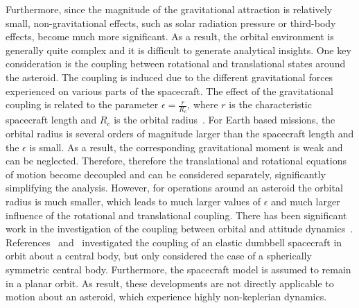 \documentclass[letterpaper, paper,11pt]{AAS}		%
\begin{document}
Furthermore, since the magnitude of the gravitational attraction is relatively small, non-gravitational effects, such as solar radiation pressure or third-body effects, become much more significant.
As a result, the orbital environment is generally quite complex and it is difficult to generate analytical insights.
One key consideration is the coupling between rotational and translational states around the asteroid.
The coupling is induced due to the different gravitational forces experienced on various parts of the spacecraft.
The effect of the gravitational coupling is related to the parameter \(\epsilon = \frac{r}{R_c}\), where \(r\) is the characteristic spacecraft length and \(R_c\) is the orbital radius~\cite{hughes2004}.
For Earth based missions, the orbital radius is several orders of magnitude larger than the spacecraft length and the \(\epsilon\) is small.
As a result, the corresponding gravitational moment is weak and can be neglected. 
Therefore, therefore the translational and rotational equations of motion become decoupled and can be considered separately, significantly simplifying the analysis. 
However, for operations around an asteroid the orbital radius is much smaller, which leads to much larger values of \(\epsilon\) and much larger influence of the rotational and translational coupling.
There has been significant work in the investigation of the coupling between orbital and attitude dynamics~\cite{elmasri2005, sanyal2004, fruh2013}.
References~ and~ investigated the coupling of an elastic dumbbell spacecraft in orbit about a central body, but only considered the case of a spherically symmetric central body.
Furthermore, the spacecraft model is assumed to remain in a planar orbit.
As result, these developments are not directly applicable to motion about an asteroid, which experience highly non-keplerian dynamics.
\end{document}

